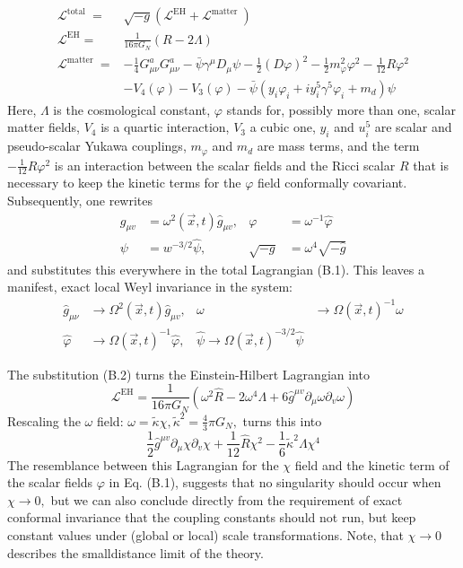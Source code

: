 \documentclass[main.tex]{subfiles}
\begin{document}
$$
\begin{aligned}
\mathcal{L}^{\text {total }}=& \sqrt{-g}\left(\mathcal{L}^{\mathrm{EH}}+\mathcal{L}^{\text {matter }}\right) \\
\mathcal{L}^{\mathrm{EH}}=& \frac{1}{16 \pi G_{N}}(R-2 \Lambda) \\
\mathcal{L}^{\text {matter }}=&-\frac{1}{4} G_{\mu \nu}^{a} G_{\mu \nu}^{a}-\bar{\psi} \gamma^{\mu} D_{\mu} \psi-\frac{1}{2}(D \varphi)^{2}-\frac{1}{2} m_{\varphi}^{2} \varphi^{2}-\frac{1}{12} R \varphi^{2} \\
&-V_{4}(\varphi)-V_{3}(\varphi)-\bar{\psi}\left(y_{i} \varphi_{i}+i y_{i}^{5} \gamma^{5} \varphi_{i}+m_{d}\right) \psi
\end{aligned}
$$
Here, $\Lambda$ is the cosmological constant, $\varphi$ stands for, possibly more than one, scalar matter fields, $V_{4}$ is a quartic interaction, $V_{3}$ a cubic one, $y_{i}$ and $u_{i}^{5}$ are scalar and pseudo-scalar Yukawa couplings, $m_{\varphi}$ and $m_{d}$ are mass terms, and the term $-\frac{1}{12} R \varphi^{2}$ is an interaction between the scalar fields and the Ricci scalar $R$ that is necessary to keep the kinetic terms for the $\varphi$ field conformally covariant. Subsequently, one rewrites
$$
\begin{aligned}
g_{\mu v} &=\omega^{2}(\vec{x}, t) \hat{g}_{\mu v}, & \varphi &=\omega^{-1} \hat{\varphi} \\
\psi &=w^{-3 / 2} \hat{\psi}, & \sqrt{-g} &=\omega^{4} \sqrt{-\hat{g}}
\end{aligned}
$$
and substitutes this everywhere in the total Lagrangian (B.1). This leaves a manifest, exact local Weyl invariance in the system:
$$
\begin{aligned}
\hat{g}_{\mu \nu} & \rightarrow \Omega^{2}(\vec{x}, t) \hat{g}_{\mu v}, & \omega & \rightarrow \Omega(\vec{x}, t)^{-1} \omega \\
\hat{\varphi} & \rightarrow \Omega(\vec{x}, t)^{-1} \hat{\varphi}, & \hat{\psi} \rightarrow \Omega(\vec{x}, t)^{-3 / 2} \hat{\psi}
\end{aligned}
$$

The substitution (B.2) turns the Einstein-Hilbert Lagrangian into
$$
\mathcal{L}^{\mathrm{EH}}=\frac{1}{16 \pi G_{N}}\left(\omega^{2} \hat{R}-2 \omega^{4} \Lambda+6 \hat{g}^{\mu v} \partial_{\mu} \omega \partial_{v} \omega\right)
$$
Rescaling the $\omega$ field: $\omega=\tilde{\kappa} \chi, \tilde{\kappa}^{2}=\frac{4}{3} \pi G_{N},$ turns this into
$$
\frac{1}{2} \hat{g}^{\mu v} \partial_{\mu} \chi \partial_{v} \chi+\frac{1}{12} \hat{R} \chi^{2}-\frac{1}{6} \tilde{\kappa}^{2} \Lambda \chi^{4}
$$
The resemblance between this Lagrangian for the $\chi$ field and the kinetic term of the scalar fields $\varphi$ in Eq. (B.1), suggests that no singularity should occur when $\chi \rightarrow 0,$ but we can also conclude directly from the requirement of exact conformal invariance that the coupling constants should not run, but keep constant values under (global or local) scale transformations. Note, that $\chi \rightarrow 0$ describes the smalldistance limit of the theory.
\end{document}
